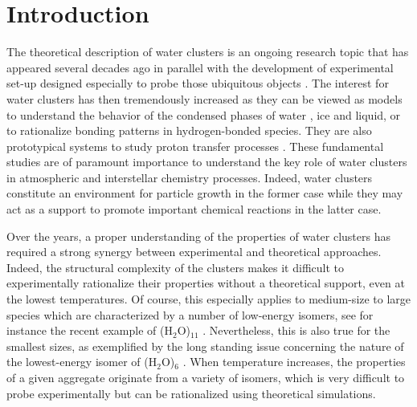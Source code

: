 \documentclass[]{interact}
\theoremstyle{plain}%
\theoremstyle{definition}
\theoremstyle{remark}
\begin{document}
\section{Introduction}

The theoretical description of water clusters is an ongoing research topic that has appeared several decades ago
in parallel with the development of experimental set-up designed especially to probe those ubiquitous objects
\cite{Haberland1986,Liu1996a,Paul1997,Paul1999,Buck2000,Keutsch2001,Keutsch2001b}.
The interest for water clusters has then tremendously increased as they can be viewed as models to understand the
behavior of the condensed phases of water \cite{Gregory1997,Keutsch2001a}, ice and liquid, or to rationalize bonding patterns in
hydrogen-bonded species. They are also prototypical systems to study proton transfer processes \cite{Wolke2016}.
These fundamental studies are of paramount importance to understand the key role of water clusters  in atmospheric and interstellar chemistry processes. Indeed, water clusters constitute  an environment  for particle growth in the former case while they may  act as a support to promote  important chemical reactions in the latter case. 


Over the years, a proper understanding of the properties of water clusters has required a strong synergy between experimental
and theoretical approaches. Indeed, the structural complexity of the clusters makes it difficult to experimentally rationalize 
their properties without a theoretical support, even at the lowest temperatures. Of course, this especially applies to
medium-size to large species which are characterized by a number of low-energy isomers, see for instance the recent
example of  (H$_{2}$O)$_{11}$ \cite{Temelso2018}. Nevertheless, this is also true for the smallest sizes, as
exemplified by the long standing issue concerning the nature of the lowest-energy isomer of (H$_{2}$O)$_{6}$
\cite{Liu1996,Liu1997,Steinbach2004,Saykally2012,Perez2012}. When temperature increases, the properties of a given aggregate
originate from a variety of isomers, which is very difficult to probe experimentally \cite{Wang2012,Temelso2018} but
can be rationalized using theoretical simulations.
\end{document}
